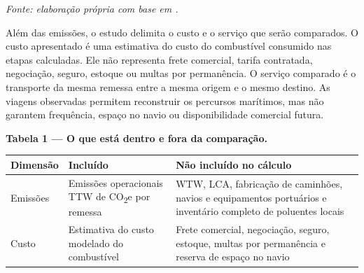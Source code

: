 \documentclass[brazil,]{article}
\newcommand{\keeptable}{\Needspace{0.64\textheight}}
\begin{document}
\emph{Fonte: elaboração própria com base em
\parencite{decarb2024,maritimelca2024}.}

Além das emissões, o estudo delimita o custo e o serviço que serão
comparados. O custo apresentado é uma estimativa do custo do combustível
consumido nas etapas calculadas. Ele não representa frete comercial,
tarifa contratada, negociação, seguro, estoque ou multas por
permanência. O serviço comparado é o transporte da mesma remessa entre a
mesma origem e o mesmo destino. As viagens observadas permitem
reconstruir os percursos marítimos, mas não garantem frequência, espaço
no navio ou disponibilidade comercial futura.

\keeptable
\textbf{Tabela 1 --- O que está dentro e fora da comparação.}

\begin{longtable}[]{@{}lll@{}}
\toprule
\begin{minipage}[b]{0.10\columnwidth}\raggedright
Dimensão\strut
\end{minipage} & \begin{minipage}[b]{0.36\columnwidth}\raggedright
Incluído\strut
\end{minipage} & \begin{minipage}[b]{0.45\columnwidth}\raggedright
Não incluído no cálculo\strut
\end{minipage}\tabularnewline
\midrule
\endhead
\begin{minipage}[t]{0.10\columnwidth}\raggedright
Emissões\strut
\end{minipage} & \begin{minipage}[t]{0.36\columnwidth}\raggedright
Emissões operacionais TTW de CO\textsubscript{2}e por remessa\strut
\end{minipage} & \begin{minipage}[t]{0.45\columnwidth}\raggedright
WTW, LCA, fabricação de caminhões, navios e equipamentos portuários e
inventário completo de poluentes locais\strut
\end{minipage}\tabularnewline
\begin{minipage}[t]{0.10\columnwidth}\raggedright
Custo\strut
\end{minipage} & \begin{minipage}[t]{0.36\columnwidth}\raggedright
Estimativa do custo modelado do combustível\strut
\end{minipage} & \begin{minipage}[t]{0.45\columnwidth}\raggedright
Frete comercial, negociação, seguro, estoque, multas por permanência e
reserva de espaço no navio\strut

\end{minipage}
\end{longtable}
\end{document}
